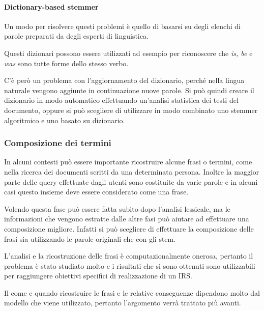 


\paragraph{Dictionary-based stemmer}

Un modo per risolvere questi problemi è quello di basarsi su degli elenchi di parole preparati da degli esperti di linguistica.

Questi dizionari possono essere utilizzati ad esempio per riconoscere che \textit{is, be} e \textit{was} sono tutte forme dello stesso verbo.

C'è però un problema con l'aggiornamento del dizionario, perché nella lingua naturale vengono aggiunte in continuazione nuove parole.
Si può quindi creare il dizionario in modo automatico effettuando un'analisi statistica dei testi del documento, oppure si può scegliere di utilizzare in modo combinato uno stemmer algoritmico e uno basato su dizionario.

\subsubsection{Composizione dei termini}

In alcuni contesti può essere importante ricostruire alcune frasi o termini, come nella ricerca dei documenti scritti da una determinata persona.
Inoltre la maggior parte delle query effettuate dagli utenti sono costituite da varie parole e in alcuni casi questo insieme deve essere considerato come una frase.

Volendo questa fase può essere fatta subito dopo l'analisi lessicale, ma le informazioni che vengono estratte dalle altre fasi può aiutare ad effettuare una composizione migliore.
Infatti si può scegliere di effettuare la composizione delle frasi sia utilizzando le parole originali che con gli stem.

L'analisi e la ricostruzione delle frasi è computazionalmente onerosa, pertanto il problema è stato studiato molto e i risultati che si sono ottenuti sono utilizzabili per raggiungere obiettivi specifici di realizzazione di un IRS.

Il come e quando ricostruire le frasi e le relative conseguenze dipendono molto dal modello che viene utilizzato, pertanto l'argomento verrà trattato più avanti.

